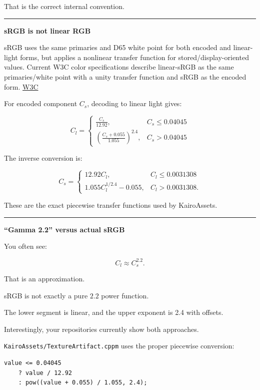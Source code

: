That is the correct internal convention.

\begin{center}\rule{0.5\linewidth}{0.5pt}\end{center}

\textbf{sRGB is not linear RGB}

sRGB uses the same primaries and D65 white point for both encoded and linear-light forms, but applies a nonlinear transfer function for stored/display-oriented values. Current W3C color specifications describe linear-sRGB as the same primaries/white point with a unity transfer function and sRGB as the encoded form. \href{https://www.w3.org/TR/css-color/?utm_source=chatgpt.com}{W3C}

For encoded component \(C_s\), decoding to linear light gives:

\[
\boxed{
C_l=
\begin{cases}
\frac{C_s}{12.92},
&
C_s\le0.04045
\\[6pt]
\left(
\frac{C_s+0.055}{1.055}
\right)^{2.4},
&
C_s>0.04045
\end{cases}
}
\]

The inverse conversion is:

\[
\boxed{
C_s=
\begin{cases}
12.92C_l,
&
C_l\le0.0031308
\\[6pt]
1.055C_l^{1/2.4}-0.055,
&
C_l>0.0031308.
\end{cases}
}
\]

These are the exact piecewise transfer functions used by KairoAssets.

\begin{center}\rule{0.5\linewidth}{0.5pt}\end{center}

\textbf{``Gamma 2.2'' versus actual sRGB}

You often see:

\[
C_l\approx C_s^{2.2}.
\]

That is an approximation.

sRGB is not exactly a pure \(2.2\) power function.

The lower segment is linear, and the upper exponent is 2.4 with offsets.

Interestingly, your repositories currently show both approaches.

\texttt{KairoAssets/TextureArtifact.cppm} uses the proper piecewise conversion:

\begin{verbatim}
value <= 0.04045
    ? value / 12.92
    : pow((value + 0.055) / 1.055, 2.4);
\end{verbatim}

